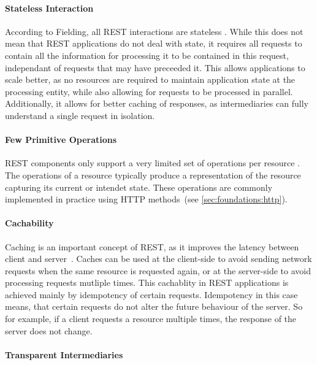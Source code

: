 \paragraph{Stateless Interaction}

According to Fielding, all \ac{REST} interactions are stateless \cite{Fielding2000}.
While this does not mean that \ac{REST} applications do not deal with state, it requires all requests to contain all the information for processing it to be contained in this request, independant of requests that may have preceeded it.
This allows applications to scale better, as no resources are required to maintain application state at the processing entity, while also allowing for requests to be processed in parallel.
Additionally, it allows for better caching of responses, as intermediaries can fully understand a single request in isolation.

\paragraph{Few Primitive Operations}

\ac{REST} components only support a very limited set of operations per resource \cite{Erenkrantz2007}.
The operations of a resource typically produce a representation of the resource capturing its current or intendet state.
These operations are commonly implemented in practice using \ac{HTTP} methods~(see \autoref{sec:foundations:http}).

\paragraph{Cachability}

Caching is an important concept of \ac{REST}, as it improves the latency between client and server~\cite{Erenkrantz2007,Fielding2000}.
Caches can be used at the client-side to avoid sending network requests when the same resource is requested again, or at the server-side to avoid processing requests mutliple times.
This cachablity in \ac{REST} applications is achieved mainly by idempotency of certain requests.
Idempotency in this case means, that certain requests do not alter the future behaviour of the server.
So for example, if a client requests a resource multiple times, the response of the server does not change.

\paragraph{Transparent Intermediaries}


